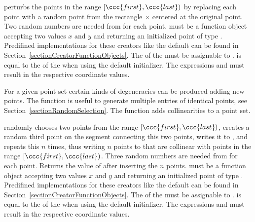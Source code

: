 { perturbs the points in the range $[\ccc{first},\ccc{last})$ by
  replacing each point with a random point from the rectangle
   $\times$  centered at the original point.
  Two random numbers are needed from  for each point.
  \ccPrecond   {} must be a function object accepting two
     values $x$ and $y$ and returning an initialized point
     of type . Predifined implementations for these
    creators like the default can be found in
    Section~\ref{sectionCreatorFunctionObjects}. The  of the
     must be assignable to .
     is equal to the  of the
     when using the default initializer.
    The expressions  and
     must result in the respective
    coordinate values.
}


For a given point set certain kinds of degeneracies can be produced
adding new points. The  function is
useful to generate multiple entries of identical points, see
Section~\ref{sectionRandomSelection}. The
 function adds collinearities to
a point set.


\def\ccLongParamLayout{\ccTrue}
{ randomly chooses two points from the range $[\ccc{first},\ccc{last})$,
    creates a random third point on the segment connecting this two
    points, writes it to , and repeats this $n$ times, thus
    writing $n$ points to  that are collinear with points
    in the range $[\ccc{first},\ccc{last})$.
    Three random numbers are needed from  for each point.
    Returns the value of  after inserting the $n$ points.
  \ccPrecond  {} must be a function object accepting two
     values $x$ and $y$ and returning an initialized point
     of type . Predifined implementations for these
    creators like the default can be found in
    Section~\ref{sectionCreatorFunctionObjects}. The  of the
     must be assignable to .
     is equal to the  of the
     when using the default initializer.
    The expressions  and
     must result in the respective
    coordinate values.
}
\def\ccLongParamLayout{\ccFalse}


